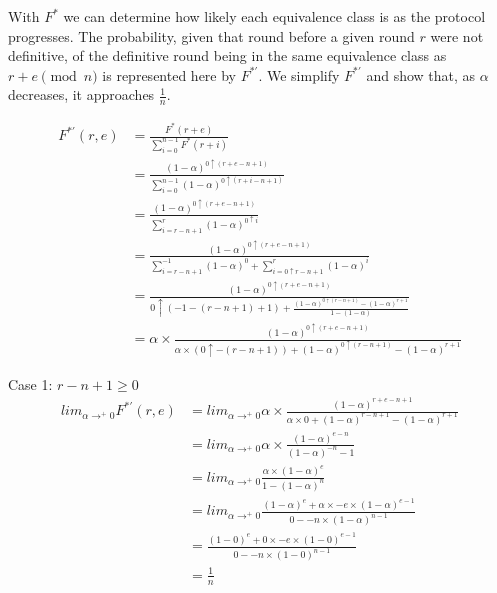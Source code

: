 \documentclass{dalcsthesis}
\begin{document}
With $F^{*}$ we can determine how likely each equivalence class is as the protocol progresses. The probability, given that round before a given round $r$ were not definitive, of the definitive round being in the same equivalence class as $r+e \pmod{n}$ is represented here by $F^{*'}$. We simplify $F^{*'}$ and show that, as $\alpha$ decreases, it approaches $\frac{1}{n}$.

\begin{align*}
F^{*'}(r, e)
  &= \frac{F^{*}(r+e)}{\sum_{i=0}^{n-1} F^{*}(r+i)}
\\&= \frac{(1-\alpha)^{0 \uparrow (r + e - n + 1)}}{\sum_{i=0}^{n-1} (1-\alpha)^{0 \uparrow (r + i - n + 1)}}
\\&= \frac{(1-\alpha)^{0 \uparrow (r + e - n + 1)}}{\sum_{i=r-n+1}^{r} (1-\alpha)^{0 \uparrow i}}
\\&= \frac{(1-\alpha)^{0 \uparrow (r + e - n + 1)}}{\sum_{i=r-n+1}^{-1} (1-\alpha)^0 + \sum_{i=0 \uparrow {r-n+1}}^{r} (1-\alpha)^i}
\\&= \frac{(1-\alpha)^{0 \uparrow (r + e - n + 1)}}{0 \uparrow (-1 -(r-n+1) + 1) + \frac{(1-\alpha)^{0 \uparrow (r-n+1)} - (1-\alpha)^{r+1}}{1-(1-\alpha)}}
\\&= \alpha \times \frac{(1-\alpha)^{0 \uparrow (r + e - n + 1)}}{\alpha \times (0 \uparrow -(r-n+1)) + (1-\alpha)^{0 \uparrow (r-n+1)} - (1-\alpha)^{r+1}}
\end{align*}

Case 1: $r-n+1 \geq 0$ 
\begin{align*}
lim_{\alpha \rightarrow^{+} 0} F^{*'}(r, e)
  &= lim_{\alpha \rightarrow^{+} 0} \alpha \times \frac{(1-\alpha)^{r + e - n + 1}}{\alpha \times 0 + (1-\alpha)^{r-n+1} - (1-\alpha)^{r+1}}
\\&= lim_{\alpha \rightarrow^{+} 0} \alpha \times \frac{(1-\alpha)^{e - n}}{(1-\alpha)^{-n} - 1}
\\&= lim_{\alpha \rightarrow^{+} 0} \frac{\alpha \times (1-\alpha)^e}{1 - (1-\alpha)^n}
\\&= lim_{\alpha \rightarrow^{+} 0} \frac{(1-\alpha)^e + \alpha \times -e \times (1-\alpha)^{e-1}}{0 - -n \times (1-\alpha)^{n-1}}
\\&= \frac{(1-0)^e + 0 \times -e \times (1-0)^{e-1}}{0 - -n \times (1-0)^{n-1}}
\\&= \frac{1}{n}
\end{align*} 
\end{document}
